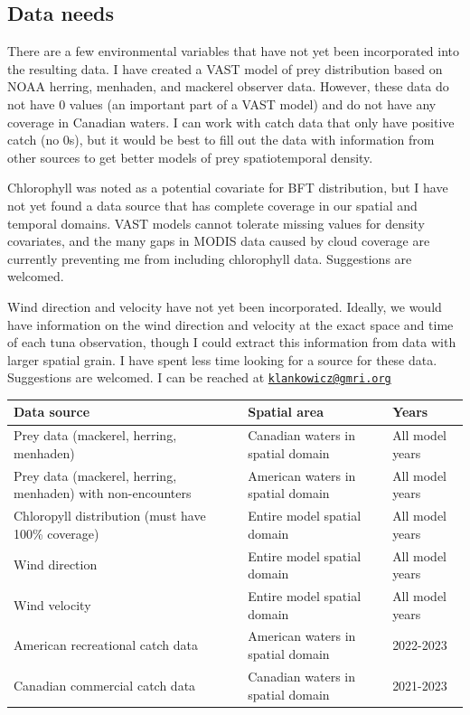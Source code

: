 \documentclass[
]{article}
\let\origtable\table
\let\endorigtable\endtable
\renewenvironment{table}[1][2] {
    \expandafter\origtable\expandafter[H]
} {
    \endorigtable
}
\begin{document}
\hypertarget{data-needs}{%
\subsection{Data needs}\label{data-needs}}

There are a few environmental variables that have not yet been incorporated into the resulting data. I have created a VAST model of prey distribution based on NOAA herring, menhaden, and mackerel observer data. However, these data do not have 0 values (an important part of a VAST model) and do not have any coverage in Canadian waters. I can work with catch data that only have positive catch (no 0s), but it would be best to fill out the data with information from other sources to get better models of prey spatiotemporal density.

Chlorophyll was noted as a potential covariate for BFT distribution, but I have not yet found a data source that has complete coverage in our spatial and temporal domains. VAST models cannot tolerate missing values for density covariates, and the many gaps in MODIS data caused by cloud coverage are currently preventing me from including chlorophyll data. Suggestions are welcomed.

Wind direction and velocity have not yet been incorporated. Ideally, we would have information on the wind direction and velocity at the exact space and time of each tuna observation, though I could extract this information from data with larger spatial grain. I have spent less time looking for a source for these data. Suggestions are welcomed. I can be reached at \href{mailto:klankowicz@gmri.org}{\nolinkurl{klankowicz@gmri.org}}

\begin{table}[H]

\caption{\label{tab:dataneeds-table}Table 4: Data needs}
\centering
\begin{tabular}[t]{lll}
\toprule
Data source & Spatial area & Years\\
\midrule
Prey data (mackerel, herring, menhaden) & Canadian waters in spatial domain & All model years\\
Prey data (mackerel, herring, menhaden) with non-encounters & American waters in spatial domain & All model years\\
Chloropyll distribution (must have 100\% coverage) & Entire model spatial domain & All model years\\
Wind direction & Entire model spatial domain & All model years\\
Wind velocity & Entire model spatial domain & All model years\\
\addlinespace
American recreational catch data & American waters in spatial domain & 2022-2023\\
Canadian commercial catch data & Canadian waters in spatial domain & 2021-2023\\
\bottomrule
\end{tabular}
\end{table}
\end{document}
